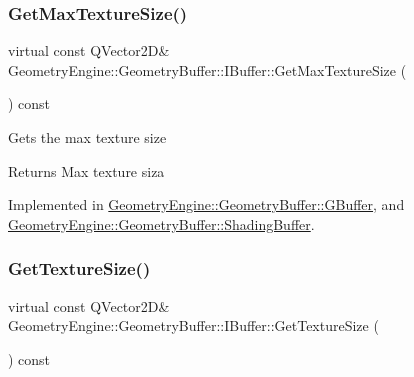 \mbox{\label{class_geometry_engine_1_1_geometry_buffer_1_1_i_buffer_a0fe7b527d30dc9c5437b8723de2c8746}} 
\subsubsection{\texorpdfstring{GetMaxTextureSize()}{GetMaxTextureSize()}}
{\footnotesize\ttfamily virtual const Q\+Vector2D\& Geometry\+Engine\+::\+Geometry\+Buffer\+::\+I\+Buffer\+::\+Get\+Max\+Texture\+Size (\begin{DoxyParamCaption}{ }\end{DoxyParamCaption}) const\hspace{0.3cm}{\ttfamily [pure virtual]}}

Gets the max texture size \begin{DoxyReturn}{Returns}
Max texture siza 
\end{DoxyReturn}


Implemented in \mbox{\hyperlink{class_geometry_engine_1_1_geometry_buffer_1_1_g_buffer_a47bda4849000d2728538de4e2f27f11a}{Geometry\+Engine\+::\+Geometry\+Buffer\+::\+G\+Buffer}}, and \mbox{\hyperlink{class_geometry_engine_1_1_geometry_buffer_1_1_shading_buffer_a6b45a6a2cc97775c11b6c6ff72bbc2b6}{Geometry\+Engine\+::\+Geometry\+Buffer\+::\+Shading\+Buffer}}.

\mbox{\label{class_geometry_engine_1_1_geometry_buffer_1_1_i_buffer_af7546a1b668af70daa255747df92181d}} 
\subsubsection{\texorpdfstring{GetTextureSize()}{GetTextureSize()}}
{\footnotesize\ttfamily virtual const Q\+Vector2D\& Geometry\+Engine\+::\+Geometry\+Buffer\+::\+I\+Buffer\+::\+Get\+Texture\+Size (\begin{DoxyParamCaption}{ }\end{DoxyParamCaption}) const\hspace{0.3cm}{\ttfamily [pure virtual]}}

